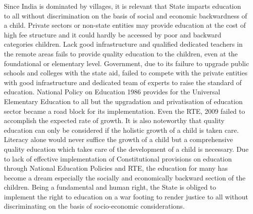 \begin{multicols}{2}

\noi
Since India is dominated by villages, it is relevant that State imparts education to all without
discrimination on the basis of social and economic backwardness of a child. Private sectors or
non-state entities may provide education at the cost of high fee structure and it could hardly
be accessed by poor and backward categories children. Lack good infrastructure and qualified
dedicated teachers in the remote areas fails to provide quality education to the children, even
at the foundational or elementary level. Government, due to its failure to upgrade public
schools and colleges with the state aid, failed to compete with the private entities with good
infrastructure and dedicated team of experts to raise the standard of education. National
Policy on Education 1986 provides for the Universal Elementary Education to all but the upgradation and privatisation of education sector became a road block for its implementation.
Even the RTE, 2009 failed to accomplish the expected rate of growth. It is also noteworthy
that quality education can only be considered if the holistic growth of a child is taken care.
Literacy alone would never suffice the growth of a child but a comprehensive quality
education which takes care of the development of a child is necessary. Due to lack of
effective implementation of Constitutional provisions on education through National Education Policies and RTE, the education for many has become a dream especially the
socially and economically backward section of the children. Being a fundamental and human
right, the State is obliged to implement the right to education on a war footing to render
justice to all without discriminating on the basis of socio-economic considerations.

\end{multicols}
